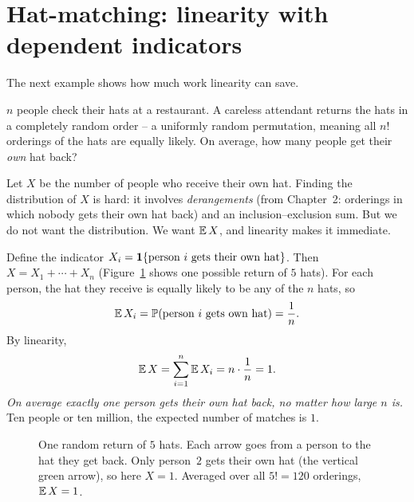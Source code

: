 \section{Hat-matching: linearity with dependent indicators}
\label{ch08:hat-matching}

The next example shows how much work linearity can save.

\begin{example}
\label{ch08:ex-hats}
$n$ people check their hats at a restaurant. A careless attendant returns the
hats in a completely random order -- a uniformly random permutation, meaning
all $n!$ orderings of the hats are equally likely. On average,
how many people get their \emph{own} hat back?

Let $X$ be the number of people who receive their own hat. Finding the
distribution of $X$ is hard: it involves \emph{derangements} (from Chapter~2:
orderings in which nobody gets their own hat back) and an inclusion--exclusion sum. But
we do not want the distribution. We want $\operatorname{\mathbb{E}} X$, and linearity makes it immediate.

Define the indicator $X_i = \mathbf{1}\{\text{person } i \text{ gets their own hat}\}$.
Then $X = X_1 + \cdots + X_n$ (Figure~\ref{ch08:fig-hat-permutation} shows one
possible return of $5$ hats). For each person, the hat they receive is equally
likely to be any of the $n$ hats, so
\[
  \operatorname{\mathbb{E}} X_i = \operatorname{\mathbb{P}}(\text{person } i \text{ gets own hat}) = \frac{1}{n}.
\]
By linearity,
\[
  \operatorname{\mathbb{E}} X = \sum_{i=1}^n \operatorname{\mathbb{E}} X_i = n \cdot \frac{1}{n} = 1.
\]
\emph{On average exactly one person gets their own hat back, no matter how large
$n$ is.} Ten people or ten million, the expected number of matches is $1$.
\end{example}

\begin{figure}[H]
\centering
{}
\caption{One random return of $5$ hats. Each arrow goes from a person to the
hat they get back. Only person~$2$ gets their own hat (the vertical green
arrow), so here $X = 1$. Averaged over all $5! = 120$ orderings, $\operatorname{\mathbb{E}} X = 1$.}
\label{ch08:fig-hat-permutation}
\end{figure}

